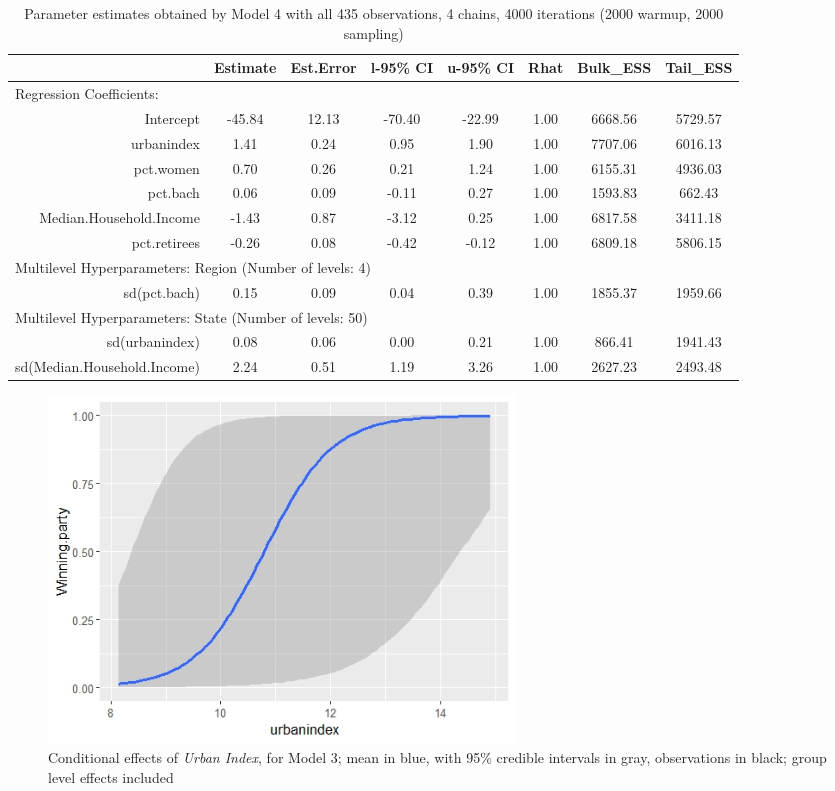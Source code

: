 \documentclass[12pt]{article}
\begin{document}
\begin{table}[ht!]
	\centering
	\caption{Parameter estimates obtained by Model 4 with all 435 observations, 4 chains, 4000 iterations (2000 warmup, 2000 sampling)}
	\label{tab:model4}
	\begin{adjustbox}{max width=\textwidth}
	\begin{tabular}{rccccccc}
		\hline
		& Estimate & Est.Error & l-95\% CI & u-95\% CI & Rhat & Bulk\_ESS & Tail\_ESS \\ 
		\hline
				 \multicolumn{8}{l}{Regression Coefficients:} \\
		Intercept & -45.84 & 12.13 & -70.40 & -22.99 & 1.00 & 6668.56 & 5729.57 \\ 
		urbanindex & 1.41 & 0.24 & 0.95 & 1.90 & 1.00 & 7707.06 & 6016.13 \\ 
		pct.women & 0.70 & 0.26 & 0.21 & 1.24 & 1.00 & 6155.31 & 4936.03 \\ 
		pct.bach & 0.06 & 0.09 & -0.11 & 0.27 & 1.00 & 1593.83 & 662.43 \\ 
		Median.Household.Income & -1.43 & 0.87 & -3.12 & 0.25 & 1.00 & 6817.58 & 3411.18 \\ 
		pct.retirees & -0.26 & 0.08 & -0.42 & -0.12 & 1.00 & 6809.18 & 5806.15 \\
		\midrule
		\multicolumn{8}{l}{Multilevel Hyperparameters: Region (Number of levels: 4)} \\ 
		sd(pct.bach) & 0.15 & 0.09 & 0.04 & 0.39 & 1.00 & 1855.37 & 1959.66 \\
		\midrule
		\multicolumn{8}{l}{Multilevel Hyperparameters: State (Number of levels: 50)}                       \\  
		sd(urbanindex) & 0.08 & 0.06 & 0.00 & 0.21 & 1.00 & 866.41 & 1941.43 \\ 
		sd(Median.Household.Income) & 2.24 & 0.51 & 1.19 & 3.26 & 1.00 & 2627.23 & 2493.48 \\ 
		\hline
	\end{tabular}
	\end{adjustbox}
	
\end{table}

\begin{figure}[h!]
	\centering
	\caption{Conditional effects of \textit{Urban Index}, for Model 3; mean in blue, with 95\% credible intervals in gray, observations in black;  group level effects included}
	\label{fig:cond_eff_mod3}
	\includegraphics[width=0.6\textwidth]{results/cond_eff_urb_model3_groupeff.jpeg}
	
\end{figure}
\end{document}
